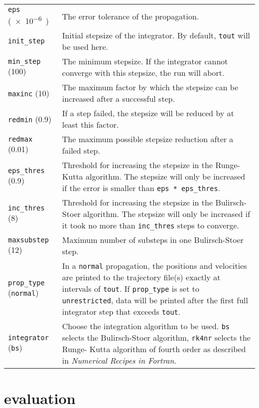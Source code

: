 \documentclass[paper=a4,pagesize,DIV=12,BCOR=12mm]{scrbook}
\begin{document}
\begin{tabular}{p{}p{}}
    \verb+eps+ (\SI{e-6})            & The error tolerance of the propagation. \\
    \verb+init_step+                 & Initial stepsize of the integrator. By default, \verb+tout+ will
                                       be used here. \\
    \verb+min_step+ (100)            & The minimum stepsize. If the integrator cannot converge with
                                       this stepsize, the run will abort. \\
    \verb+maxinc+ (10)               & The maximum factor by which the stepsize can be increased after
                                       a successful step. \\
    \verb+redmin+ (0.9)              & If a step failed, the stepsize will be reduced by at least this
                                       factor. \\
    \verb+redmax+ (0.01)             & The maximum possible stepsize reduction after a failed step. \\
    \verb+eps_thres+ (0.9)           & Threshold for increasing the stepsize in the Runge-Kutta algorithm.
                                       The stepsize will only be increased if the error is smaller than
                                       \verb+eps * eps_thres+. \\
    \verb+inc_thres+ (8)             & Threshold for increasing the stepsize in the Bulirsch-Stoer algorithm.
                                       The stepsize will only be increased if it took no more than \verb+inc_thres+
                                       steps to converge. \\
    \verb+maxsubstep+ (12)           & Maximum number of substeps in one Bulirsch-Stoer step. \\
    \verb+prop_type+ (\verb+normal+) & In a \verb+normal+ propagation, the positions and velocities
                                       are printed to the trajectory file(s) exactly at intervals of
                                       \verb+tout+. If \verb+prop_type+ is set to \verb+unrestricted+,
                                       data will be printed after the first full integrator step that
                                       exceeds \verb+tout+. \\
    \verb+integrator+ (\verb+bs+)    & Choose the integration algorithm to be used. \verb+bs+ selects
                                       the Bulirsch-Stoer algorithm, \verb+rk4nr+ selects the Runge-
                                       Kutta algorithm of fourth order as described in \emph{Numerical
                                       Recipes in Fortran}. \\
\end{tabular}

\chapter{evaluation}
\end{document}
